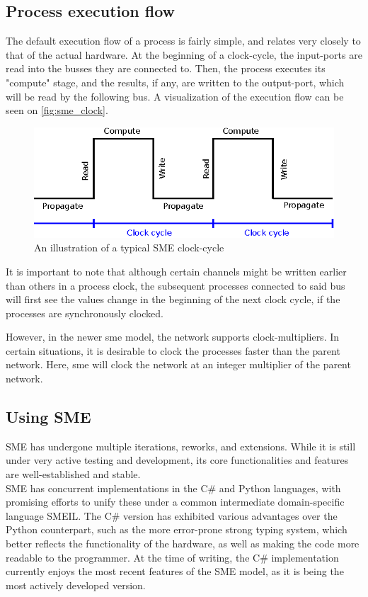 \subsection{Process execution flow}
The default execution flow of a process is
fairly simple, and relates very closely to that of the actual hardware. At
the beginning of a clock-cycle, the input-ports are read into the busses
they are connected to. Then, the process executes its "compute" stage, and
the results, if any, are written to the output-port, which will be read
by the following bus. A visualization of the execution flow can be seen
on \autoref{fig:sme_clock}.
\begin{figure}[h!]
\centering
\includegraphics[width=\linewidth]{background/sme_clock.eps}
\caption{An illustration of a typical SME clock-cycle}
\label{fig:sme_clock}
\end{figure}

It is important to note that although certain channels might be written earlier
than others in a process clock, the subsequent processes connected to said bus
will first see the values change in the beginning of the next clock
cycle, if the processes are synchronously clocked.

However, in the newer \gls{sme} model, the network
supports clock-multipliers. In certain situations, it is desirable to clock the
processes faster than the parent network. Here, \gls{sme} will clock the
network at an integer multiplier of the parent network.

\subsection{Using SME}
SME has undergone multiple iterations, reworks, and extensions. While
it is still under very active testing and development, its core
functionalities and features
 are well-established and stable\cite{bus_centric_sme}.\\
SME has concurrent implementations in the C\# and Python languages,
with promising efforts to unify these under a common intermediate
domain-specific language SMEIL\cite{smeil}. The C\# version has
exhibited various advantages over the Python counterpart, such as
the more error-prone strong typing system, which better reflects the
functionality of the hardware, as well as making the code more readable to
the programmer. At the time of writing, the C\# implementation currently
enjoys the most recent features of the SME model, as it is being the
most actively developed version.



